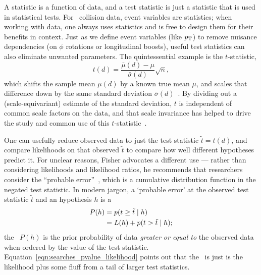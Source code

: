 A statistic is a function of data, and a test statistic is just a statistic
that is used in statistical tests.
For \atlas\ collision data, event variables are statistics; when working with
data, one always uses statistics and is free to design them for their benefits
in context.
Just as we define event variables (like $p_\mathrm{T}$) to remove nuisance
dependencies (on $\phi$ rotations or longitudinal boosts),
useful test statistics can also eliminate unwanted parameters.
The quintessential example is the $t$-statistic,
\begin{equation}
\label{eqn:searches_t_statistic}
t(d) = \frac{\bar{\mu}(d) - \mu}{\bar{\sigma}(d)}\sqrt{n}
,
\end{equation}
which shifts the sample mean $\bar{\mu}(d)$ by a known true mean $\mu$, and
scales that difference down by the same standard deviation
$\bar{\sigma}(d)$~\cite{student1908, fisher1925t}.
By dividing out a (scale-equivariant) estimate of the standard deviation, $t$
is independent of common scale factors on the data, and that scale invariance
has helped to drive the study and common use of this
$t$-statistic~\cite{lehmann2011fisher}.

One can usefully reduce observed data to just the test statistic
$\tilde{t} = t(d)$, and compare likelihoods on that observed $\tilde{t}$
to compare how well different hypotheses predict it.
For unclear reasons, Fisher advocates a different use ---
rather than considering likelihoods and likelihood ratios, he recommends
that researchers consider the ``probable error''~\cite{fisher1921probable},
which is a cumulative distribution function in the negated test statistic.
In modern jargon, a `probable error' at the observed test statistic
$\tilde{t}$ and an hypothesis $h$ is a \textbf{\pvalue}
\begin{align}
P(h)
&= p(t \geq \tilde{t} \mid h)
\label{eqn:searches_pvalue}
\\
&= L(h) + p(t > \tilde{t} \mid h)
\label{eqn:searches_pvalue_likelihood}
;
\end{align}
the \pvalue\ $P(h)$ is the prior probability of data
\emph{greater or equal to} the observed data when ordered by the value of the
test statistic.
Equation~\ref{eqn:searches_pvalue_likelihood} points out that the \pvalue\ is
just is the likelihood plus some fluff from a tail of larger test statistics.

